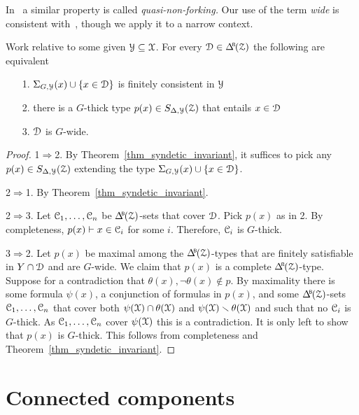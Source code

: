In~\cite{CK} a similar property is called \textit{quasi-non-forking.}
Our use of the term \textit{wide\/} is consistent with~\cite{Hr}, though we apply it to a narrow context.

\begin{theorem}\label{thm_syndetic_invariant2}
  Work relative to some given $\EuScript Y\subseteq\EuScript X$.
  For every $\D\in\BDelta(\Z)$ the following are equivalent 
  \begin{itemize}
    \item[1.] $\Sigma_{G,\EuScript Y}(x)\cup\{x\in\EuScript D\}$ is finitely consistent in $\EuScript Y$
    \item[2.] there is a $G$-thick type $p(x)\in S_{\Delta,\EuScript Y}(\EuScript Z)$ that entails $x\in\EuScript D$
    \item[3.] $\EuScript D$ is $G$-wide.\smallskip
  \end{itemize}
\end{theorem}

\begin{proof}
  1$\Rightarrow$2.
  By Theorem~\ref{thm_syndetic_invariant}, it suffices to pick any $p(x)\in S_{\Delta,\EuScript Y}(\EuScript Z)$ extending the type $\Sigma_{G,\EuScript Y}(x)\cup\{x\in\EuScript D\}$.

  2$\Rightarrow$1.
  By Theorem~\ref{thm_syndetic_invariant}.

  2$\Rightarrow$3.
  Let $\EuScript C_1,\dots,\EuScript C_n$ be $\BDelta({\Z})$-sets that cover $\EuScript D$.
  Pick $p(x)$ as in 2.
  By completeness, $p(x)\vdash x\in\EuScript C_i$ for some $i$.
  Therefore, $\EuScript C_i$ is $G$-thick.

  3$\Rightarrow$2.
  Let $p(x)$ be maximal among the $\BDelta(\Z)$-types that are finitely satisfiable in $Y\cap\EuScript D$ and are $G$-wide.
  We claim that $p(x)$ is a complete $\BDelta(\Z)$-type.
  Suppose for a contradiction that $\theta(x),\neg\theta(x)\notin p$.
  By maximality there is some formula $\psi(x)$, a conjunction of formulas in $p(x)$, and some $\BDelta({\Z})$-sets $\EuScript C_1,\dots,\EuScript C_n$ that cover both $\psi(\EuScript X)\cap\theta(\EuScript X)$ and $\psi(\EuScript X)\smallsetminus\theta(\EuScript X)$ and such that no $\EuScript C_i$ is $G$-thick.
  As $\EuScript C_1,\dots,\EuScript C_n$ cover $\psi(\EuScript X)$ this is a contradiction.
  It is only left to show that $p(x)$ is $G$-thick.
  This follows from completeness and Theorem~\ref{thm_syndetic_invariant}.
\end{proof}


\section{Connected components}\label{G0}
\def\medrel#1{\parbox[t]{5ex}{$\displaystyle\hfil #1$}}
\def\ceq#1#2#3{\parbox[t]{12ex}{$\displaystyle #1$}\medrel{#2}{$\displaystyle #3$}}

